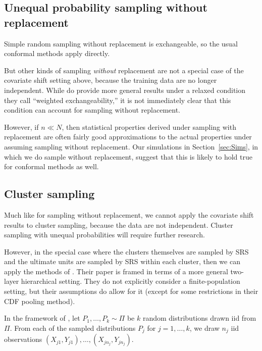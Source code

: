 \documentclass[10.5pt, letterpaper]{article}
\numberwithin{table}{section}
\numberwithin{figure}{section}
\numberwithin{equation}{section}
\begin{document}
\subsection{Unequal probability sampling without replacement}

Simple random sampling without replacement is exchangeable, so the usual conformal methods apply directly.

But other kinds of sampling \emph{without} replacement are not a special case of the covariate shift setting above, because the training data are no longer independent. While \cite{tibshirani2019conformal} do provide more general results under a relaxed condition they call ``weighted exchangeability,'' it is not immediately clear that this condition can account for sampling without replacement.

However, if $n \ll N$, then statistical properties derived under sampling with replacement are often fairly good approximations to the actual properties under assuming sampling without replacement. Our simulations in Section~\ref{sec:Sims}, in which we do sample without replacement, suggest that this is likely to hold true for conformal methods as well.




\subsection{Cluster sampling}\label{sec:Cluster}

Much like for sampling without replacement, we cannot apply the covariate shift results to cluster sampling, because the data are not independent. Cluster sampling with unequal probabilities will require further research.

However, in the special case where the clusters themselves are sampled by SRS and the ultimate units are sampled by SRS within each cluster, then we can apply the methods of \cite{dunn2022distribution}. Their paper is framed in terms of a more general two-layer hierarchical setting. They do not explicitly consider a finite-population setting, but their assumptions do allow for it (except for some restrictions in their CDF pooling method).

In the framework of \cite{dunn2022distribution}, let $P_1,\ldots,P_k \sim \Pi$ be $k$ random distributions drawn iid from $\Pi$. From each of the sampled distributions $P_j$ for $j=1,\ldots,k$, we draw $n_j$ iid observations $(X_{j1}, Y_{j1}),\ldots,(X_{jn_j}, Y_{jn_j})$.
\end{document}
